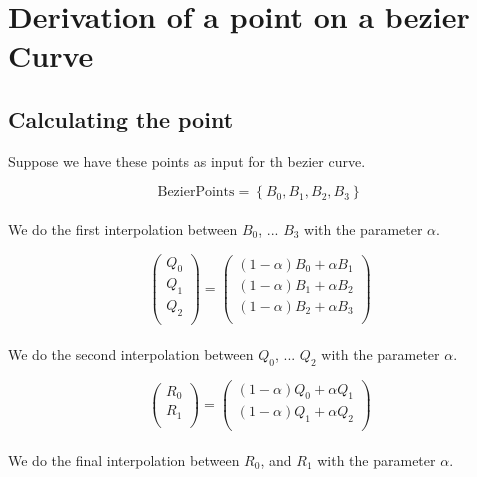 \section{Derivation of a point on a bezier Curve}

\subsection{Calculating the point}
Suppose we have these points as input for th bezier curve.

\begin{equation*}
    \text{BezierPoints}=\left\{B_0,B_1,B_2,B_3\right\}
\end{equation*}
\\
We do the first interpolation between $B_0$, ... $B_3$ with the parameter $\alpha$.

\begin{equation*}
    \left(
    \begin{array}{c}
        Q_0 \\
        Q_1 \\
        Q_2 \\
    \end{array}
    \right)=\left(
    \begin{array}{c}
        (1-\alpha ) B_0+\alpha  B_1 \\
        (1-\alpha ) B_1+\alpha  B_2 \\
        (1-\alpha ) B_2+\alpha  B_3 \\
    \end{array}
    \right)
\end{equation*}
\\
We do the second interpolation between $Q_0$, ... $Q_2$ with the parameter $\alpha$.

\begin{equation*}
    \left(
    \begin{array}{c}
        R_0 \\
        R_1 \\
    \end{array}
    \right)=\left(
    \begin{array}{c}
        (1-\alpha ) Q_0+\alpha  Q_1 \\
        (1-\alpha ) Q_1+\alpha  Q_2 \\
    \end{array}
    \right)
\end{equation*}
\\
We do the final interpolation between $R_0$, and $R_1$ with the parameter $\alpha$.

